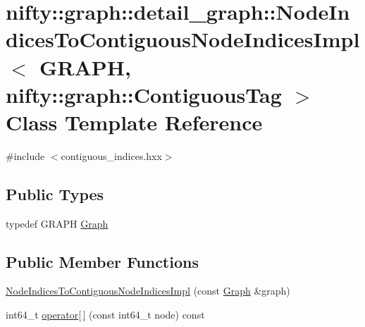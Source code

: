 \hypertarget{classnifty_1_1graph_1_1detail__graph_1_1NodeIndicesToContiguousNodeIndicesImpl_3_01GRAPH_00_01ni9b1f0e77953ef9967804436d9931bab9}{}\section{nifty\+:\+:graph\+:\+:detail\+\_\+graph\+:\+:Node\+Indices\+To\+Contiguous\+Node\+Indices\+Impl$<$ G\+R\+A\+P\+H, nifty\+:\+:graph\+:\+:Contiguous\+Tag $>$ Class Template Reference}
\label{classnifty_1_1graph_1_1detail__graph_1_1NodeIndicesToContiguousNodeIndicesImpl_3_01GRAPH_00_01ni9b1f0e77953ef9967804436d9931bab9}


{\ttfamily \#include $<$contiguous\+\_\+indices.\+hxx$>$}

\subsection*{Public Types}
\begin{DoxyCompactItemize}
\item 
typedef G\+R\+A\+P\+H \hyperlink{classnifty_1_1graph_1_1detail__graph_1_1NodeIndicesToContiguousNodeIndicesImpl_3_01GRAPH_00_01ni9b1f0e77953ef9967804436d9931bab9_a5bfb9d22b775eeea19c32af5dfcd482f}{Graph}
\end{DoxyCompactItemize}
\subsection*{Public Member Functions}
\begin{DoxyCompactItemize}
\item 
\hyperlink{classnifty_1_1graph_1_1detail__graph_1_1NodeIndicesToContiguousNodeIndicesImpl_3_01GRAPH_00_01ni9b1f0e77953ef9967804436d9931bab9_a4247b773e3c6b878a30246a45c935d75}{Node\+Indices\+To\+Contiguous\+Node\+Indices\+Impl} (const \hyperlink{classnifty_1_1graph_1_1detail__graph_1_1NodeIndicesToContiguousNodeIndicesImpl_3_01GRAPH_00_01ni9b1f0e77953ef9967804436d9931bab9_a5bfb9d22b775eeea19c32af5dfcd482f}{Graph} \&graph)
\item 
int64\+\_\+t \hyperlink{classnifty_1_1graph_1_1detail__graph_1_1NodeIndicesToContiguousNodeIndicesImpl_3_01GRAPH_00_01ni9b1f0e77953ef9967804436d9931bab9_a30191e2b4ecf6f075fe69e53480b9ae0}{operator\mbox{[}$\,$\mbox{]}} (const int64\+\_\+t node) const 
\end{DoxyCompactItemize}


